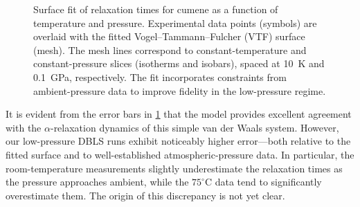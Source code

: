 \begin{figure}[!htbp]
{
	}
	\caption{Surface fit of relaxation times for cumene as a function of temperature and pressure. Experimental data points (symbols) are overlaid with the fitted Vogel--Tammann--Fulcher (VTF) surface (mesh). The mesh lines correspond to constant-temperature and constant-pressure slices (isotherms and isobars), spaced at 10~K and 0.1~GPa, respectively. The fit incorporates constraints from ambient-pressure data to improve fidelity in the low-pressure regime.}
	\label{figure:SurfaceFit}
\end{figure}

It is evident from the error bars in \fig \ref{figure:SurfaceFit} that the model provides excellent agreement with the $\alpha$-relaxation dynamics of this simple van der Waals system. However, our low-pressure DBLS runs exhibit noticeably higher error---both relative to the fitted surface and to well-established atmospheric-pressure data. In particular, the room-temperature measurements slightly underestimate the relaxation times as the pressure approaches ambient, while the $75^{\circ}\mathrm{C}$ data tend to significantly overestimate them. The origin of this discrepancy is not yet clear.

